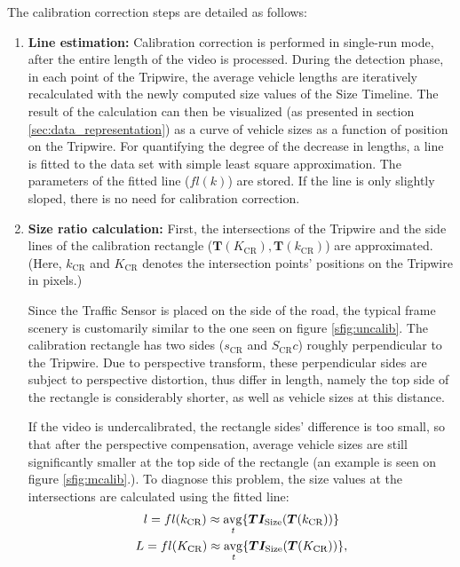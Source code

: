 \noindent The calibration correction steps are detailed as follows:
\begin{enumerate}[align=parleft]
	\item  \textbf{Line estimation:} 
	Calibration correction is performed in single-run mode, after the entire length of the video is processed.
	During the detection phase, in each point of the Tripwire, the average vehicle lengths are iteratively recalculated with the newly computed size values of the Size Timeline.
	The result of the calculation can then be visualized (as presented in section \ref{sec:data_representation}) as a curve of vehicle sizes as a function of position on the Tripwire.
	For quantifying the degree of the decrease in lengths, a line is fitted to the data set with simple least square approximation.
	The parameters of the fitted line ($fl(k)$) are stored.
	If the line is only slightly sloped, there is no need for calibration correction. 
	
	\item  \textbf{Size ratio calculation:}
	First, the intersections of the Tripwire and the side lines of the calibration rectangle ($\boldsymbol{T}(K_{\text{CR}}), \boldsymbol{T}(k_{\text{CR}})$) are approximated.
	(Here, $k_{\text{CR}}$ and $K_{\text{CR}}$ denotes the intersection points' positions on the Tripwire in pixels.)
	
	Since the Traffic Sensor is placed on the side of the road, the typical frame scenery is customarily similar to the one seen on figure \ref{sfig:uncalib}.
	The calibration rectangle has two sides ($s_{\text{CR}}$ and $S_{\text{CR}}c$) roughly perpendicular to the Tripwire.
	Due to perspective transform, these perpendicular sides are subject to perspective distortion, thus differ in length, namely the top side of the rectangle is considerably shorter, as well as vehicle sizes at this distance.
	
	If the video is undercalibrated, the rectangle sides' difference is too small, so that after the perspective compensation, average vehicle sizes are still significantly smaller at the top side of the rectangle (an example is seen on figure \ref{sfig:mcalib}.).
	To diagnose this problem, the size values at the intersections are calculated using the fitted line:
	\begin{gather*}
		l = fl(k_{\text{CR}}) \approx \operatorname{\underset{\textit{t}}{avg}}\{\boldsymbol{TI_{\text{Size}}}(\boldsymbol{T}(k_{\text{CR}}))\} \\
		L = fl(K_{\text{CR}}) \approx \operatorname{\underset{\textit{t}}{avg}}\{\boldsymbol{TI_{\text{Size}}}(\boldsymbol{T}(K_{\text{CR}}))\},
	\end{gather*}
	

\end{enumerate}
